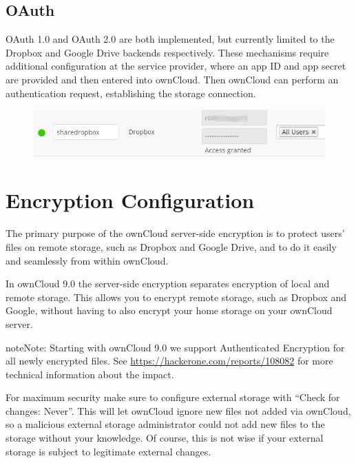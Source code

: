 \documentclass[letterpaper,10pt,english]{sphinxmanual}
\begin{document}
\subsection{OAuth}
\label{configuration_files/external_storage/auth_mechanisms:oauth}
OAuth 1.0 and OAuth 2.0 are both implemented, but currently limited to the
Dropbox and Google Drive backends respectively. These mechanisms require
additional configuration at the service provider, where an app ID and app
secret are provided and then entered into ownCloud. Then ownCloud can
perform an authentication request, establishing the storage connection.
\begin{figure}[htbp]
\centering

\includegraphics{dropbox-oc.png}
\end{figure}


\section{Encryption Configuration}
\label{configuration_files/encryption_configuration:encryption-configuration}\label{configuration_files/encryption_configuration::doc}
The primary purpose of the ownCloud server-side encryption is to protect users'
files on remote storage, such as Dropbox and Google Drive, and to do it easily
and seamlessly from within ownCloud.

In ownCloud 9.0 the server-side encryption separates encryption of local and
remote storage. This allows you to encrypt remote storage, such as Dropbox and
Google, without having to also encrypt your home storage on your ownCloud
server.

\begin{notice}{note}{Note:}
Starting with ownCloud 9.0 we support Authenticated Encryption for all
newly encrypted files. See \href{https://hackerone.com/reports/108082}{https://hackerone.com/reports/108082} for more
technical information about the impact.

For maximum security make sure to configure external storage with ``Check for
changes: Never''. This will let ownCloud ignore new files not added via ownCloud,
so a malicious external storage administrator could not add new files to the
storage without your knowledge. Of course, this is not wise if your external
storage is subject to legitimate external changes.
\end{notice}
\end{document}
